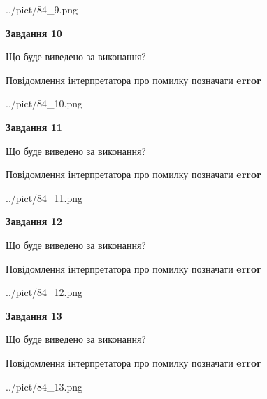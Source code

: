 \documentclass[11pt, ukrainian]{article}
\begin{document}
{\begin {large}
\begin{center}
	{../pict/84_9.png}
\end{center}
\newpage

{\begin {center}\textbf{Завдання 10}\end {center}}\par
Що буде виведено за виконання? \par
Повідомлення інтерпретатора про помилку позначати \textbf{error}

\begin{center}
	{../pict/84_10.png}
\end{center}
\newpage

{\begin {center}\textbf{Завдання 11}\end {center}}\par
Що буде виведено за виконання? \par
Повідомлення інтерпретатора про помилку позначати \textbf{error}

\begin{center}
	{../pict/84_11.png}
\end{center}
\newpage

{\begin {center}\textbf{Завдання 12}\end {center}}\par
Що буде виведено за виконання? \par
Повідомлення інтерпретатора про помилку позначати \textbf{error}

\begin{center}
	{../pict/84_12.png}
\end{center}
\newpage

{\begin {center}\textbf{Завдання 13}\end {center}}\par
Що буде виведено за виконання? \par
Повідомлення інтерпретатора про помилку позначати \textbf{error}

\begin{center}
	{../pict/84_13.png}
\end{center}
\newpage


\end{large}}
\end{document}
